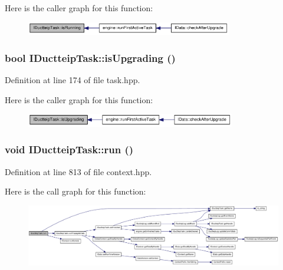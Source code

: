 Here is the caller graph for this function:\nopagebreak
\begin{figure}[H]
\begin{center}
\leavevmode
\includegraphics[width=255pt]{class_i_ductteip_task_a91d7a4855bd1f2b82608c4da8f4dd778_icgraph}
\end{center}
\end{figure}
\hypertarget{class_i_ductteip_task_a2fb81b703881918d054382d6894f0a77}{
\subsubsection[{isUpgrading}]{\setlength{\rightskip}{0pt plus 5cm}bool IDuctteipTask::isUpgrading ()}}
\label{class_i_ductteip_task_a2fb81b703881918d054382d6894f0a77}


Definition at line 174 of file task.hpp.

Here is the caller graph for this function:\nopagebreak
\begin{figure}[H]
\begin{center}
\leavevmode
\includegraphics[width=259pt]{class_i_ductteip_task_a2fb81b703881918d054382d6894f0a77_icgraph}
\end{center}
\end{figure}
\hypertarget{class_i_ductteip_task_abe3d6c79a56e71982297a88ff9a0921c}{
\subsubsection[{run}]{\setlength{\rightskip}{0pt plus 5cm}void IDuctteipTask::run ()}}
\label{class_i_ductteip_task_abe3d6c79a56e71982297a88ff9a0921c}


Definition at line 813 of file context.hpp.

Here is the call graph for this function:\nopagebreak
\begin{figure}[H]
\begin{center}
\leavevmode
\includegraphics[width=420pt]{class_i_ductteip_task_abe3d6c79a56e71982297a88ff9a0921c_cgraph}
\end{center}
\end{figure}


